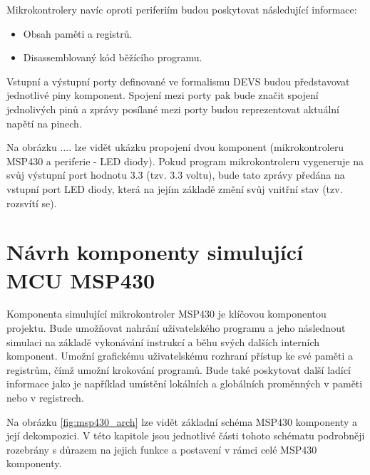 Mikrokontrolery navíc oproti periferiím budou poskytovat následující informace:

\begin{itemize}
\item Obsah paměti a registrů.
\item Disassemblovaný kód běžícího programu.
\end{itemize}

Vstupní a výstupní porty definované ve formalismu DEVS budou představovat jednotlivé piny komponent. Spojení mezi porty pak bude značit spojení jednolivých
pinů a zprávy posílané mezi porty budou reprezentovat aktuální napětí na pinech.

Na obrázku .... lze vidět ukázku propojení dvou komponent (mikrokontroleru MSP430 a periferie - LED diody). Pokud program mikrokontroleru vygeneruje na svůj 
výstupní port hodnotu 3.3 (tzv. 3.3 voltu), bude tato zprávy předána na vstupní port LED diody, která na jejím základě změní svůj vnitřní stav (tzv. rozsvítí se).

\section{Návrh komponenty simulující MCU MSP430}

Komponenta simulující mikrokontroler MSP430 je klíčovou komponentou projektu. Bude umožňovat nahrání uživatelského programu a jeho
následnout simulaci na základě vykonávání instrukcí a běhu svých dalších interních komponent. Umožní grafickému uživatelskému
rozhraní přístup ke své paměti a registrům, čímž umožní krokování programů. Bude také poskytovat další ladící informace jako je například
umístění lokálních a globálních proměnných v paměti nebo v registrech. \cite{cvs}

Na obrázku \ref{fig:msp430_arch} lze vidět základní schéma MSP430 komponenty a její dekompozici. V této kapitole jsou jednotlivé části tohoto schématu podrobněji rozebrány s důrazem na jejich funkce a postavení v rámci celé MSP430 komponenty.

